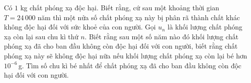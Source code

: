 \begin{ex}%
	Có $1$ kg chất phóng xạ độc hại. Biết rằng, cứ sau một khoảng thời gian $T=24\,000$ năm thì một nửa số chất phóng xạ này bị phân rã thành chất khác không độc hại đối với sức khoẻ của con người. Gọi $u_n$ là khối lượng chất phóng xạ còn lại sau chu kì thứ $n$. Biết rằng sau một số năm nào đó khối lượng chất phóng xạ đã cho ban đầu không còn độc hại  đối với con người, biết rằng chất phóng xạ này sẽ không độc hại nữa nếu khối lượng chất phóng xạ còn lại bé hơn $10^{-6}$\,g. Tìm số chu kì bé nhất để chất phóng xạ đã cho ban đầu không còn độc hại đối với con người.
\end{ex}

